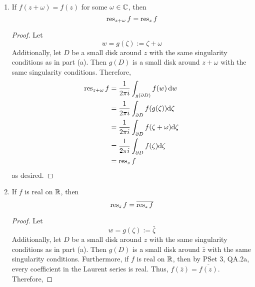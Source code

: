 \documentclass[../psets.tex]{subfiles}
\begin{document}
\begin{enumerate}[ref={A.\arabic*}]
\begin{enumerate}
\begin{proof}
\begin{align*}
                &= \frac{1}{2\pi i}\int_{\partial D}f(\zeta)\dd\zeta\\
                &= \res_zf
            \end{align*}
            as desired.
        \end{proof}
        \item If $f(z+\omega)=f(z)$ for some $\omega\in\mathbb{C}$, then
        \begin{equation*}
            \operatorname{res}_{z+\omega}f = \operatorname{res}_zf
        \end{equation*}
        \begin{proof}
            Let
            \begin{equation*}
                w = g(\zeta) := \zeta+\omega
            \end{equation*}
            Additionally, let $D$ be a small disk around $z$ with the same singularity conditions as in part (a). Then $g(D)$ is a small disk around $z+\omega$ with the same singularity conditions. Therefore,
            \begin{align*}
                \operatorname{res}_{z+\omega}f &= \frac{1}{2\pi i}\int_{g(\partial D)}f(w)\dd{w}\\
                &= \frac{1}{2\pi i}\int_{\partial D}f(g(\zeta))\dd\zeta\\
                &= \frac{1}{2\pi i}\int_{\partial D}f(\zeta+\omega)\dd\zeta\\
                &= \frac{1}{2\pi i}\int_{\partial D}f(\zeta)\dd\zeta\\
                &= \operatorname{res}_zf
            \end{align*}
            as desired.
        \end{proof}
        \item If $f$ is real on $\mathbb{R}$, then
        \begin{equation*}
            \operatorname{res}_{\bar{z}}f = \overline{\operatorname{res}_zf}
        \end{equation*}
        \begin{proof}
            Let
            \begin{equation*}
                w = g(\zeta) := \bar{\zeta}
            \end{equation*}
            Additionally, let $D$ be a small disk around $z$ with the same singularity conditions as in part (a). Then $g(D)$ is a small disk around $\bar{z}$ with the same singularity conditions. Furthermore, if $f$ is real on $\mathbb{R}$, then by PSet 3, QA.2a, every coefficient in the Laurent series is real. Thus, $f(\bar{z})=\overline{f(z)}$. Therefore,

\end{proof}
\end{enumerate}
\end{enumerate}
\end{document}
